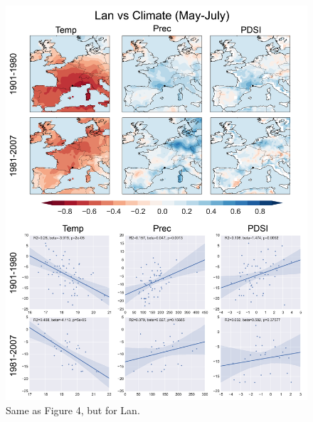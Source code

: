 \documentclass[12pt]{article}
\begin{document}
\begin{figure}
\center
\includegraphics[width=.9\columnwidth,scale=2]{SUPP_fig_08_Lan_MJJ_climate_onedeg.png}
\caption{Same as Figure 4, but for Lan.}
\end{figure}
\end{document}

